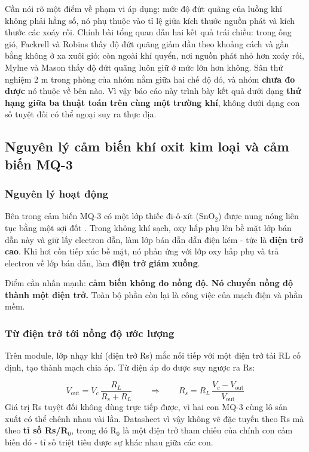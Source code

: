 \begin{ghichu}
Cần nói rõ một điểm về phạm vi áp dụng: mức độ đứt quãng của luồng khí không phải hằng số, nó phụ thuộc vào tỉ lệ giữa kích thước nguồn phát và kích thước các xoáy rối. Chính bài tổng quan \cite{r1} dẫn hai kết quả trái chiều: trong ống gió, Fackrell và Robins thấy độ đứt quãng giảm dần theo khoảng cách và gần bằng không ở xa xuôi gió; còn ngoài khí quyển, nơi nguồn phát nhỏ hơn xoáy rối, Mylne và Mason thấy độ đứt quãng luôn giữ ở mức lớn hơn không. Sân thử nghiệm 2 m trong phòng của nhóm nằm giữa hai chế độ đó, và nhóm \textbf{chưa đo được} nó thuộc về bên nào. Vì vậy báo cáo này trình bày kết quả dưới dạng \textbf{thứ hạng giữa ba thuật toán trên cùng một trường khí}, không dưới dạng con số tuyệt đối có thể ngoại suy ra thực địa.
\end{ghichu}

\subsection{Nguyên lý cảm biến khí oxit kim loại và cảm biến MQ-3}

\subsubsection{Nguyên lý hoạt động}
Bên trong cảm biến MQ-3 có một lớp thiếc đi-ô-xít (SnO$_{2}$) được nung nóng liên tục bằng một sợi đốt \cite{r7}. Trong không khí sạch, oxy hấp phụ lên bề mặt lớp bán dẫn này và giữ lấy electron dẫn, làm lớp bán dẫn dẫn điện kém - tức là \textbf{điện trở cao}. Khi hơi cồn tiếp xúc bề mặt, nó phản ứng với lớp oxy hấp phụ và trả electron về lớp bán dẫn, làm \textbf{điện trở giảm xuống}.

Điểm cần nhấn mạnh: \textbf{cảm biến không đo nồng độ. Nó chuyển nồng độ thành một điện trở.} Toàn bộ phần còn lại là công việc của mạch điện và phần mềm.


\subsubsection{Từ điện trở tới nồng độ ước lượng}
Trên module, lớp nhạy khí (điện trở Rs) mắc nối tiếp với một điện trở tải RL cố định, tạo thành mạch chia áp. Từ điện áp đo được suy ngược ra Rs:

\[ V_{\text{out}} = V_c\,\frac{R_L}{R_s+R_L} \qquad\Longrightarrow\qquad R_s = R_L\,\frac{V_c - V_{\text{out}}}{V_{\text{out}}} \]
Giá trị Rs tuyệt đối không dùng trực tiếp được, vì hai con MQ-3 cùng lô sản xuất có thể chênh nhau vài lần. Datasheet vì vậy không vẽ đặc tuyến theo Rs mà theo \textbf{tỉ số Rs/R$_{0}$}, trong đó R$_{0}$ là một điện trở tham chiếu của chính con cảm biến đó - tỉ số triệt tiêu được sự khác nhau giữa các con.

